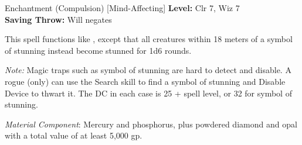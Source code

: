 {Enchantment (Compulsion) [Mind-Affecting]}
{
	\textbf{Level:}
	Clr 7, Wiz 7\\
	\textbf{Saving Throw:}
	Will negates\\
}
{
	This spell functions like , except that all creatures within 18 meters of a symbol of stunning instead become stunned for 1d6 rounds.

	\textit{Note:} Magic traps such as symbol of stunning are hard to detect and disable. A rogue (only) can use the Search skill to find a symbol of stunning and Disable Device to thwart it. The DC in each case is 25 + spell level, or 32 for symbol of stunning.

	\textit{Material Component}:
	Mercury and phosphorus, plus powdered diamond and opal with a total value of at least 5,000 gp.

}
